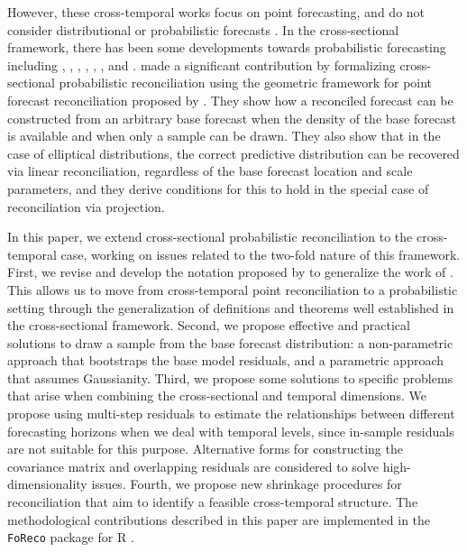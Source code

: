 \documentclass[a4paper,11pt]{article}
\theoremstyle{definition}
\begin{document}
However, these cross-temporal works focus on point forecasting, and do not consider distributional or probabilistic forecasts \citep{gneiting2014}. In the cross-sectional framework, there has been some developments towards probabilistic forecasting including  \cite{bentaieb2017}, \cite{panamtash2018}, \cite{jeon2019}, \cite{bentaieb2021}, \cite{corani2021}, \cite{corani2022}, and \cite{zambon2022}. \cite{panagiotelis2023} made a significant contribution by formalizing cross-sectional probabilistic reconciliation using the geometric framework for point forecast reconciliation proposed by \cite{panagiotelis2021}. They show how a reconciled forecast can be constructed from an arbitrary base forecast when the density of the base forecast is available and when only a sample can be drawn. They also show that in the case of elliptical distributions, the correct predictive distribution can be recovered via linear reconciliation, regardless of the base forecast location and scale parameters, and they derive conditions for this to hold in the special case of reconciliation via projection.

In this paper, we extend cross-sectional probabilistic reconciliation to the cross-temporal case, working on issues related to the two-fold nature of this framework. First, we revise and develop the notation proposed by \cite{difonzo2023} to generalize the work of \cite{panagiotelis2023}. This allows us to move from cross-temporal point reconciliation to a probabilistic setting through the generalization of definitions and theorems well established in the cross-sectional framework. Second, we propose effective and practical solutions to draw a sample from the base forecast distribution: a non-parametric approach that bootstraps the base model residuals, and a parametric approach that assumes Gaussianity. Third, we propose some solutions to specific problems that arise when combining the cross-sectional and temporal dimensions. We propose using multi-step residuals to estimate the relationships between different forecasting horizons when we deal with temporal levels, since in-sample residuals are not suitable for this purpose. Alternative forms for constructing the covariance matrix and overlapping residuals are considered to solve high-dimensionality issues. Fourth, we propose new shrinkage procedures for reconciliation that aim to identify a feasible cross-temporal structure. The methodological contributions described in this paper are implemented in the \texttt{FoReco} package for R \citep{girolimetto2022}.
\end{document}
